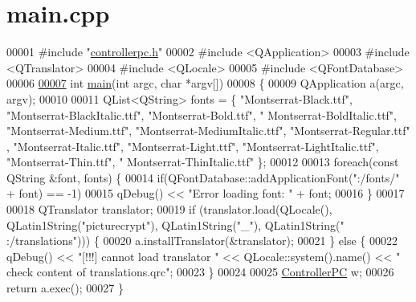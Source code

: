 \hypertarget{main_8cpp_source}{}\section{main.\+cpp}
\label{main_8cpp_source}

\begin{DoxyCode}
00001 \textcolor{preprocessor}{#include "\hyperlink{controllerpc_8h}{controllerpc.h}"}
00002 \textcolor{preprocessor}{#include <QApplication>}
00003 \textcolor{preprocessor}{#include <QTranslator>}
00004 \textcolor{preprocessor}{#include <QLocale>}
00005 \textcolor{preprocessor}{#include <QFontDatabase>}
00006 
\hypertarget{main_8cpp_source.tex_l00007}{}\hyperlink{main_8cpp_a0ddf1224851353fc92bfbff6f499fa97}{00007} \textcolor{keywordtype}{int} \hyperlink{main_8cpp_a0ddf1224851353fc92bfbff6f499fa97}{main}(\textcolor{keywordtype}{int} argc, \textcolor{keywordtype}{char} *argv[])
00008 \{
00009     QApplication a(argc, argv);
00010 
00011     QList<QString> fonts = \{ \textcolor{stringliteral}{"Montserrat-Black.ttf"}, \textcolor{stringliteral}{"Montserrat-BlackItalic.ttf"}, \textcolor{stringliteral}{"Montserrat-Bold.ttf"}, \textcolor{stringliteral}{"
      Montserrat-BoldItalic.ttf"}, \textcolor{stringliteral}{"Montserrat-Medium.ttf"}, \textcolor{stringliteral}{"Montserrat-MediumItalic.ttf"}, \textcolor{stringliteral}{"Montserrat-Regular.ttf"}
      , \textcolor{stringliteral}{"Montserrat-Italic.ttf"}, \textcolor{stringliteral}{"Montserrat-Light.ttf"}, \textcolor{stringliteral}{"Montserrat-LightItalic.ttf"}, \textcolor{stringliteral}{"Montserrat-Thin.ttf"}, \textcolor{stringliteral}{"
      Montserrat-ThinItalic.ttf"} \};
00012 
00013     \textcolor{keywordflow}{foreach}(\textcolor{keyword}{const} QString &font, fonts) \{
00014         \textcolor{keywordflow}{if}(QFontDatabase::addApplicationFont(\textcolor{stringliteral}{":/fonts/"} + font) == -1)
00015             qDebug() << \textcolor{stringliteral}{"Error loading font: "} + font;
00016     \}
00017 
00018     QTranslator translator;
00019     \textcolor{keywordflow}{if} (translator.load(QLocale(), QLatin1String(\textcolor{stringliteral}{"picturecrypt"}), QLatin1String(\textcolor{stringliteral}{"\_"}), QLatin1String(\textcolor{stringliteral}{"
      :/translations"}))) \{
00020         a.installTranslator(&translator);
00021     \} \textcolor{keywordflow}{else} \{
00022         qDebug() << \textcolor{stringliteral}{"[!!!] cannot load translator "} << QLocale::system().name() << \textcolor{stringliteral}{" check content of
       translations.qrc"};
00023     \}
00024 
00025     \hyperlink{class_controller_p_c}{ControllerPC} w;
00026     \textcolor{keywordflow}{return} a.exec();
00027 \}
\end{DoxyCode}
